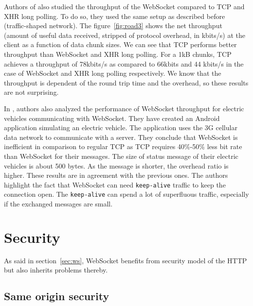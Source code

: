 \documentclass[journal,compsoc]{IEEEtran}
\newcommand{\ttt}[1]{\texttt{#1}}
\newcommand{\ws}{WebSocket}
\begin{document}
Authors of \cite{roadblock} also studied the throughput of the \ws{} compared to TCP and XHR long polling.
To do so, they used the same setup as described before (traffic-shaped network).
The figure~\ref{fig:road3} shows the net throughput (amount of useful data received, stripped of protocol overhead, in kbits/s) at the client as a function of data chunk sizes.
We can see that TCP performs better throughput than \ws{} and XHR long polling.
For a 1kB chunks, TCP achieves a throughput of 78kbits/s as compared to 66kbits and 44 kbits/s in the case of \ws{} and XHR long polling respectively.
We know that the throughput is dependent of the round trip time and the overhead, so these results are not surprising.

In \cite{EV}, authors also analyzed the performance of \ws{} throughput for electric vehicles communicating with \ws{}.
They have created an Android application simulating an electric vehicle.
The application uses the 3G cellular data network to communicate with a server.
They conclude that \ws{} is inefficient in comparison to regular TCP as TCP requires 40\%-50\% less bit rate than \ws{} for their messages.
The size of status message of their electric vehicles is about 500 bytes.
As the message is shorter, the overhead ratio is higher.
These results are in agreement with the previous ones.
The authors highlight the fact that \ws{} can need \ttt{keep-alive} traffic to keep the connection open.
The \ttt{keep-alive} can spend a lot of superfluous traffic, especially if the exchanged messages are small.


\section{Security}

As said in section~\ref{sec:ws}, \ws{} benefits from security model of the HTTP but also inherits problems thereby.

\subsection{Same origin security}
\end{document}
